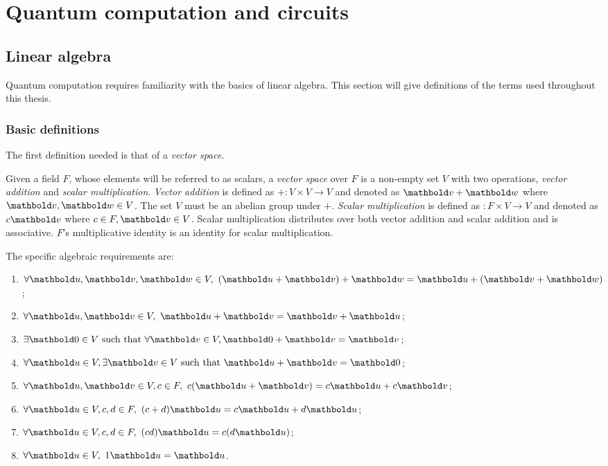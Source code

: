
\chapter{Quantum computation and circuits}\label{chap:quantumcompandcircuits}

\section{Linear algebra} %
\label{sec:linear_algebra}

Quantum computation requires  familiarity with
the basics of linear algebra. This section will give definitions of the
terms used throughout this thesis.
\subsection{Basic definitions} %
\label{sub:basic_definitions}


The first definition needed is that of a \emph{vector space}.

\begin{definition}
Given a field $F$, whose elements will be referred to as scalars,
 a \emph{vector space} over $F$ is a non-empty set $V$ with
two operations, \emph{vector addition} and \emph{scalar multiplication}.
\emph{Vector addition} is defined
as ${+}:V\times V \to V$ and denoted as $\vc{v}+\vc{w}$
 where
$\vc{v},\vc{w}\in V$. The set $V$ must be an abelian group under $+$.
\emph{Scalar multiplication} is defined as ${}:F\times V \to V$ and denoted as
$c\vc{v}$ where $c\in F, \vc{v} \in V$. Scalar multiplication
distributes over both vector addition and scalar addition and is
 associative. $F$'s multiplicative identity is
an identity for scalar multiplication.
\end{definition}
The specific algebraic requirements are:
\begin{enumerate}
\item{}$\forall \vc{u},\vc{v},\vc{w} \in V,\ (\vc{u} +\vc{v}) +\vc{w} =
 \vc{u}+ (\vc{v}+\vc{w})$;
\item{}$\forall \vc{u},\vc{v} \in V,\ \vc{u} +\vc{v} =
 \vc{v}+ \vc{u}$;
\item{}$\exists  \vc{0} \in V \mathrm{\ such\ that\ } \forall \vc{v} \in V,
 \vc{0} +\vc{v} =  \vc{v}$;
\item{}$\forall \vc{u} \in V, \exists \vc{v} \in V \mathrm{\ such\ that\ }
 \vc{u}+ \vc{v} = \vc{0}$;
\item{}$\forall \vc{u},\vc{v} \in V, c\in F,\
 c(\vc{u}+ \vc{v}) = c\vc{u} + c\vc{v}$;
\item{}$\forall \vc{u} \in V, c,d\in F,\
 (c+d)\vc{u} = c\vc{u} + d\vc{u}$;
\item{}$\forall \vc{u} \in V, c,d\in F,\
 (c d)\vc{u} = c(d\vc{u})$;
\item{}$\forall \vc{u} \in V,\
 1\vc{u} = \vc{u}$.
\end{enumerate}

